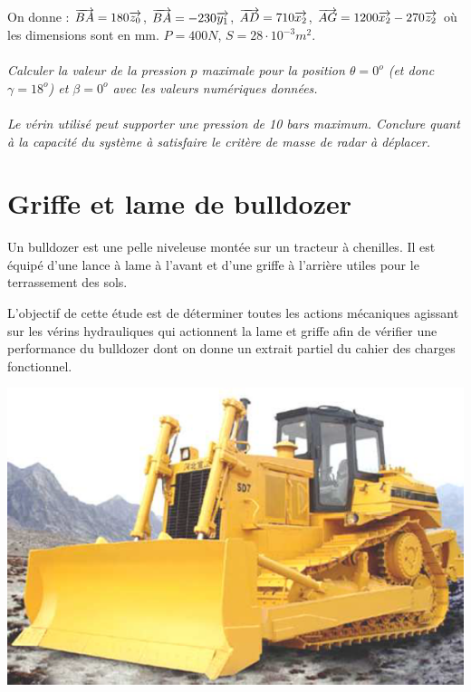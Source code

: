 \documentclass[10pt,oneside]{article}
\begin{document}
On donne : $\overrightarrow{BA}=180\overrightarrow{z_0}$, $\overrightarrow{BA}=-230\overrightarrow{y_1}$, $\overrightarrow{AD}=710\overrightarrow{x_2}$, $\overrightarrow{AG}=1200\overrightarrow{x_2}-270\overrightarrow{z_2}$ où les dimensions sont en mm. $P=400N$, $S=28\cdot 10^{-3}m^2$.

\paragraph{}
\textit{Calculer la valeur de la pression $p$ maximale pour la position $\theta=0^o$ (et donc $\gamma = 18^o$) et $\beta = 0^o$ avec les valeurs numériques données.}


\paragraph{}
\textit{Le vérin utilisé peut supporter une pression de 10 bars maximum. Conclure quant à la capacité du système à satisfaire le critère de masse de radar à déplacer.}



\section*{Griffe et lame de bulldozer}
\setcounter{paragraph}{0}

\begin{minipage}[c]{.45\linewidth}
Un bulldozer est une pelle niveleuse montée sur un tracteur à chenilles. Il est équipé d'une lance à lame à l'avant et d'une griffe à l'arrière utiles pour le terrassement des sols. 

L'objectif de cette étude est de déterminer toutes les actions mécaniques agissant sur les vérins hydrauliques qui actionnent la lame et griffe afin de vérifier une performance du bulldozer dont on donne un extrait partiel du cahier des charges fonctionnel.
\end{minipage}\hfill
\begin{minipage}[c]{.5\linewidth}
\begin{center}
\includegraphics[width=.9\textwidth]{png/img5}
\end{center}
\end{minipage}
\end{document}
